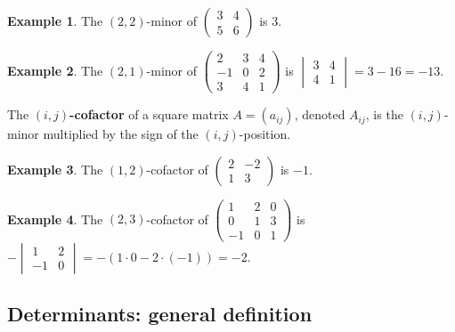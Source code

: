 \documentclass[
  12pt,
  oneside]{book}
\theoremstyle{definition}
\theoremstyle{definition}
\newtheorem{example}{Example}[chapter]
\theoremstyle{definition}
\theoremstyle{definition}
\theoremstyle{remark}
\begin{document}
\begin{example}
\protect\hypertarget{exm:unnamed-chunk-49}{}\label{exm:unnamed-chunk-49}The \((2,2)\)-minor of \(\begin{pmatrix}3&4\\5&6\end{pmatrix}\) is \(3\).
\end{example}

\begin{example}
\protect\hypertarget{exm:unnamed-chunk-50}{}\label{exm:unnamed-chunk-50}The \((2,1)\)-minor of \(\begin{pmatrix}2&3&4\\-1& 0 &2\\3&4&1\end{pmatrix}\) is \(\begin{vmatrix}3&4\\ 4&1\end{vmatrix}=3-16=-13\).
\end{example}

The \textbf{\((i,j)\)-cofactor} of a square matrix \(A=(a_{ij})\), denoted
\(A_{ij}\), is the \((i,j)\)-minor multiplied by the sign of the \((i,j)\)-position.

\begin{example}
\protect\hypertarget{exm:unnamed-chunk-51}{}\label{exm:unnamed-chunk-51}The \((1,2)\)-cofactor of \(\begin{pmatrix}2&-2\\1&3\end{pmatrix}\) is \(-1\).
\end{example}

\begin{example}
\protect\hypertarget{exm:unnamed-chunk-52}{}\label{exm:unnamed-chunk-52}The \((2,3)\)-cofactor of \(\begin{pmatrix}1&2&0\\0&1&3\\-1&0&1\end{pmatrix}\) is \(-\begin{vmatrix}1&2\\-1&0\end{vmatrix}=-(1\cdot0-2\cdot(-1))=-2\).
\end{example}

\subsection{Determinants: general definition}\label{determinants-general-definition}
\end{document}

